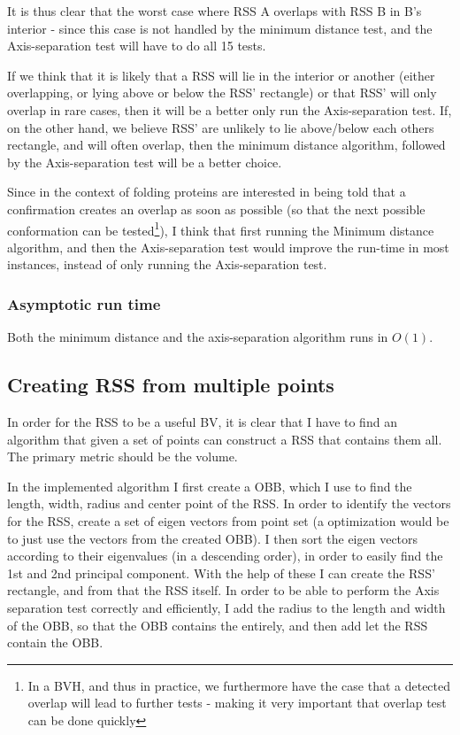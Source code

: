 It is thus clear that the worst case where RSS A overlaps with RSS B in B's interior - since this case is not handled by the minimum distance test, and the Axis-separation test will have to do all 15 tests. 

If we think that it is likely that a RSS will lie in the interior or another (either overlapping, or lying above or below the RSS' rectangle) or that RSS' will only overlap in rare cases, then it will be a better only run the Axis-separation test. If, on the other hand, we believe RSS' are unlikely to lie above/below each others rectangle, and will often overlap, then the minimum distance algorithm, followed by the Axis-separation test will be a better choice.

Since in the context of folding proteins are interested in being told that a confirmation creates an overlap as soon as possible (so that the next possible conformation can be tested\footnote{In a BVH, and thus in practice, we furthermore have the case that a detected overlap will lead to further tests - making it very important that overlap test can be done quickly}), I think that first running the Minimum distance algorithm, and then the Axis-separation test would improve the run-time in most instances, instead of only running the Axis-separation test.

\subsubsection{Asymptotic run time}
Both the minimum distance and the axis-separation algorithm runs in $O(1)$.

\subsection{Creating RSS from multiple points}
\label{multiple-points}
In order for the RSS to be a useful BV, it is clear that I have to find an algorithm that given a set of points can construct a RSS that contains them all. The primary metric should be the volume.

In the implemented algorithm I first create a OBB, which I use to find the length, width, radius and center point of the RSS. In order to identify the vectors for the RSS, create a set of eigen vectors from point set (a optimization would be to just use the vectors from the created OBB). I then sort the eigen vectors according to their eigenvalues (in a descending order), in order to easily find the 1st and 2nd principal component. With the help of these I can create the RSS' rectangle, and from that the RSS itself. In order to be able to perform the Axis separation test correctly and efficiently, I add the radius to the length and width of the OBB, so that the OBB contains the entirely, and then add let the RSS contain the OBB. 

